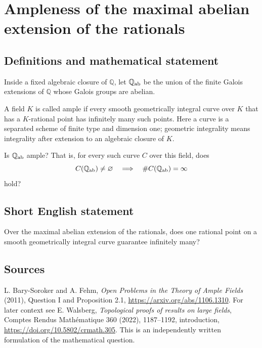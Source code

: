 \documentclass{article}
\begin{document}
\section*{Ampleness of the maximal abelian extension of the rationals}
\subsection{Definitions and mathematical statement}
Inside a fixed algebraic closure of $\mathbb Q$, let $\mathbb Q_{\rm ab}$
be the union of the finite Galois extensions of $\mathbb Q$ whose Galois
groups are abelian.

A field $K$ is called ample if every smooth geometrically integral curve
over $K$ that has a $K$-rational point has infinitely many such points.
Here a curve is a separated scheme of finite type and dimension one;
geometric integrality means integrality after extension to an algebraic
closure of $K$.

Is $\mathbb Q_{\rm ab}$ ample? That is, for every such curve $C$ over this
field, does
\[
 C(\mathbb Q_{\rm ab})\ne\varnothing
 \quad\Longrightarrow\quad \#C(\mathbb Q_{\rm ab})=\infty
\]
hold?

\subsection{Short English statement}
Over the maximal abelian extension of the rationals, does one rational point
on a smooth geometrically integral curve guarantee infinitely many?

\subsection{Sources}
L. Bary-Soroker and A. Fehm, \emph{Open Problems in the Theory of Ample
Fields} (2011), Question I and Proposition 2.1,
\url{https://arxiv.org/abs/1106.1310}.
For later context see E. Walsberg, \emph{Topological proofs of results on
large fields}, Comptes Rendus Math\'ematique 360 (2022), 1187--1192,
introduction, \url{https://doi.org/10.5802/crmath.305}.
This is an independently written formulation of the mathematical question.
\end{document}
